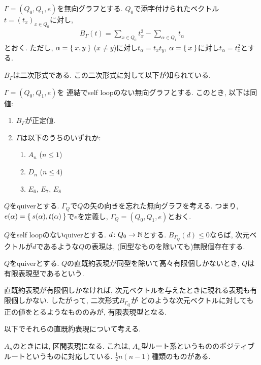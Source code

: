 \begin{definition}
  $\Gamma=(Q_0,Q_1,e)$を無向グラフとする.
  $Q_0$で添字付けられたベクトル$t=(t_x)_{x\in Q_0}$に対し,
  \begin{align*}
    B_\Gamma(t)=\sum_{x\in Q_0}t_x^2 - \sum_{\alpha \in Q_1}t_\alpha
  \end{align*}
  とおく.
  ただし,
  $\alpha=\Set{x,y}$ ($x\neq y$)に対し$t_\alpha=t_xt_y$,
  $\alpha=\Set{x}$に対し$t_\alpha=t_x^2$とする.  
\end{definition}
$B_\Gamma$は二次形式である.
この二次形式に対して以下が知られている.
\begin{lemma}
  $\Gamma=(Q_0,Q_1,e)$を
  連結でself loopのない無向グラフとする.
  このとき, 以下は同値:
  \begin{enumerate}
  \item $B_\Gamma$が正定値.
  \item $\Gamma$は以下のうちのいずれか:
    \begin{enumerate}
      \item $A_n$ ($n\leq 1$)
      \item $D_n$ ($n\leq 4$)
      \item $E_6$, $E_7$, $E_8$
    \end{enumerate}
  \end{enumerate}
\end{lemma}
\begin{definition}
  $Q$をquiverとする.
  $\Gamma_Q$で$Q$の矢の向きを忘れた無向グラフを考える.
  つまり,
  $e(\alpha)=\Set{s(\alpha), t(\alpha)}$で$e$を定義し,
  $\Gamma_Q=(Q_0,Q_1,e)$とおく.
\end{definition}

\begin{lemma}
  $Q$をself loopのないquiverとする.
  $d\colon Q_0\to \mathbb{N}$とする.
  $B_{\Gamma_Q}(d)\leq 0$ならば,
  次元ベクトルが$d$であるような$Q$の表現は,
  (同型なものを除いても)無限個存在する.
\end{lemma}


\begin{definition}
  $Q$をquiverとする.
  $Q$の直既約表現が同型を除いて高々有限個しかないとき,
  $Q$は有限表現型であるという.
\end{definition}
直既約表現が有限個しかなければ,
次元ベクトルを与えたときに現れる表現も有限個しかない.
したがって,
二次形式$B_{\Gamma_Q}$が
どのような次元ベクトルに対しても正の値をとるようなもののみが,
有限表現型となる.

以下でそれらの直既約表現について考える.
\begin{example}
  $A_n$のときには, 区間表現になる.
  これは, $A_n$型ルート系というもののポジティブルートというものに対応している.
  $\frac{1}{2}n(n-1)$種類のものがある.
\end{example}

